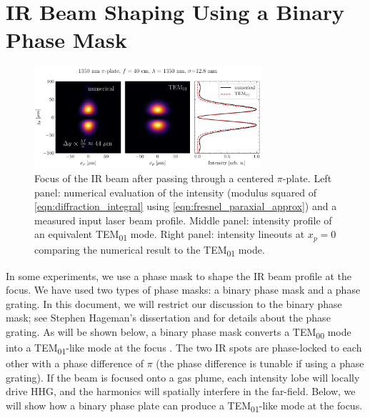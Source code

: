 \section{IR Beam Shaping Using a Binary Phase Mask}
\label{sec:pi-plate-math}

\begin{figure}
	\centering
	\includegraphics[width=0.75\textwidth]{figures/chap1/pi_plate_focus_LP_TEM_1350nm.pdf}
	\caption{Focus of the IR beam after passing through a centered $\pi$-plate. Left panel: numerical evaluation of the intensity (modulus squared of \cref{eqn:diffraction_integral} using \cref{eqn:fresnel_paraxial_approx}) and a measured input laser beam profile. Middle panel: intensity profile of an equivalent TEM\textsubscript{01} mode. Right panel: intensity lineouts at $x_p = 0$ comparing the numerical result to the TEM\textsubscript{01} mode.}
	\label{fig:pi_plate_focus_sim}
\end{figure}


In some experiments, we use a phase mask to shape the IR beam profile at the focus. We have used two types of phase masks: a binary phase mask and a phase grating. In this document, we will restrict our discussion to the binary phase mask; see Stephen Hageman's dissertation \cite{hagemanComplexAttosecondTransient2020} and \cite{camperHighRelativephasePrecision2019} for details about the phase grating. As will be shown below, a binary phase mask converts a TEM\textsubscript{00} mode into a TEM\textsubscript{01}-like mode at the focus \cite{hagemanComplexAttosecondTransient2020,camperHighRelativephasePrecision2019,camperTransverseElectromagneticMode2015,camperHighharmonicPhaseSpectroscopy2014,camperCombinedHighharmonicInterferometries2015}. The two IR spots are phase-locked to each other with a phase difference of $\pi$ (the phase difference is tunable if using a phase grating). If the beam is focused onto a gas plume, each intensity lobe will locally drive HHG, and the harmonics will spatially interfere in the far-field. Below, we will show how a binary phase plate can produce a TEM\textsubscript{01}-like mode at the focus.

